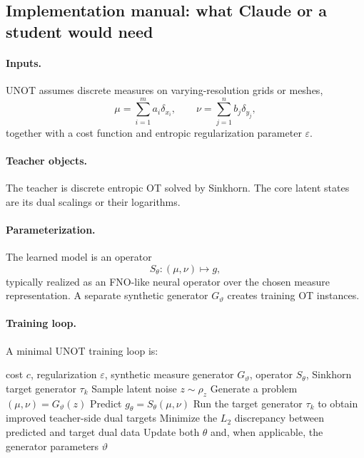 \documentclass[11pt]{report}
\begin{document}
\subsection*{Implementation manual: what Claude or a student would need}

\paragraph{Inputs.}
UNOT assumes discrete measures on
varying-resolution grids or meshes,
\begin{equation}
\mu = \sum_{i=1}^{m} a_i\delta_{x_i},
\qquad
\nu = \sum_{j=1}^{n} b_j\delta_{y_j},
\label{eq:unot-discrete-inputs}
\end{equation}
together with a cost function and entropic regularization parameter $\varepsilon$.

\paragraph{Teacher objects.}
The teacher is discrete entropic OT solved by Sinkhorn.  The core latent states are
its dual scalings or their logarithms.

\paragraph{Parameterization.}
The learned model is an operator
\begin{equation}
S_\theta : (\mu,\nu) \mapsto g,
\label{eq:unot-operator-param}
\end{equation}
typically realized as an FNO-like neural operator over the chosen measure
representation.  A separate synthetic generator $G_\vartheta$ creates training OT
instances.

\paragraph{Training loop.}
A minimal UNOT training loop is:
\begin{algorithm}[ht]
\caption{UNOT training loop}
\begin{algorithmic}[1]
\Require cost $c$, regularization $\varepsilon$, synthetic measure generator $G_\vartheta$, operator $S_\theta$, Sinkhorn target generator $\tau_k$
  \State Sample latent noise $z\sim\rho_z$
  \State Generate a problem $(\mu,\nu)=G_\vartheta(z)$
  \State Predict $g_\theta=S_\theta(\mu,\nu)$
  \State Run the target generator $\tau_k$ to obtain improved teacher-side dual targets
  \State Minimize the $L_2$ discrepancy between predicted and target dual data
  \State Update both $\theta$ and, when applicable, the generator parameters $\vartheta$
\EndFor
\end{algorithmic}
\end{algorithm}
\end{document}
